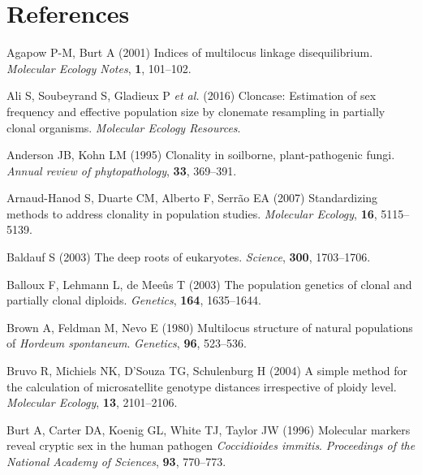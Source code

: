 \documentclass[double,12pt]{beavtex}
\begin{document}
  \chapter{References}\label{references-1}
  
  \noindent
  
  \setlength{\parindent}{-0.20in} \setlength{\leftskip}{0.20in}
  \setlength{\parskip}{8pt}
  
  \hypertarget{refs}{}
  \hypertarget{ref-Agapowux5f2001}{}
  Agapow P-M, Burt A (2001) Indices of multilocus linkage disequilibrium.
  \emph{Molecular Ecology Notes}, \textbf{1}, 101--102.
  
  \hypertarget{ref-ali2016cloncase}{}
  Ali S, Soubeyrand S, Gladieux P \emph{et al.} (2016) Cloncase:
  Estimation of sex frequency and effective population size by clonemate
  resampling in partially clonal organisms. \emph{Molecular Ecology
  Resources}.
  
  \hypertarget{ref-anderson1995clonality}{}
  Anderson JB, Kohn LM (1995) Clonality in soilborne, plant-pathogenic
  fungi. \emph{Annual review of phytopathology}, \textbf{33}, 369--391.
  
  \hypertarget{ref-arnaud2007standardizing}{}
  Arnaud-Hanod S, Duarte CM, Alberto F, Serrão EA (2007) Standardizing
  methods to address clonality in population studies. \emph{Molecular
  Ecology}, \textbf{16}, 5115--5139.
  
  \hypertarget{ref-baldauf2003deep}{}
  Baldauf S (2003) The deep roots of eukaryotes. \emph{Science},
  \textbf{300}, 1703--1706.
  
  \hypertarget{ref-balloux2003population}{}
  Balloux F, Lehmann L, de Meeûs T (2003) The population genetics of
  clonal and partially clonal diploids. \emph{Genetics}, \textbf{164},
  1635--1644.
  
  \hypertarget{ref-brown1980multilocus}{}
  Brown A, Feldman M, Nevo E (1980) Multilocus structure of natural
  populations of \emph{Hordeum spontaneum}. \emph{Genetics}, \textbf{96},
  523--536.
  
  \hypertarget{ref-bruvo2004simple}{}
  Bruvo R, Michiels NK, D'Souza TG, Schulenburg H (2004) A simple method
  for the calculation of microsatellite genotype distances irrespective of
  ploidy level. \emph{Molecular Ecology}, \textbf{13}, 2101--2106.
  
  \hypertarget{ref-burt1996molecular}{}
  Burt A, Carter DA, Koenig GL, White TJ, Taylor JW (1996) Molecular
  markers reveal cryptic sex in the human pathogen \emph{Coccidioides
  immitis}. \emph{Proceedings of the National Academy of Sciences},
  \textbf{93}, 770--773.
  
\end{document}
